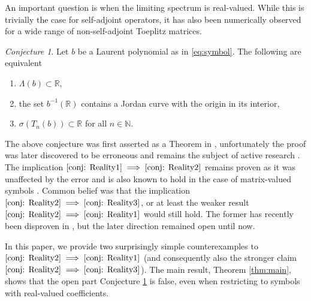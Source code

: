 \documentclass[11pt,a4paper]{amsart}
\theoremstyle{remark}
\numberwithin{equation}{section}
\newtheorem{conjecture}[theorem]{Conjecture}
\newcommand{\R}{\mathbb R}
\newcommand{\N}{\mathbb N}
\begin{document}
An important question is when the limiting spectrum is real-valued. While this is trivially the case for self-adjoint operators, it has also been numerically observed for a wide range of non-self-adjoint Toeplitz matrices.

\begin{conjecture}\label{conj: Reality}
    Let $b$ be a Laurent polynomial as in \eqref{eq:symbol}. The following are equivalent
    \begin{enumerate}
        \item\label{conj: Reality1} $\Lambda(b)\subset\R$,
        \item\label{conj: Reality2} the set $b^{-1}(\R)$ contains a Jordan curve with the origin in its interior,
        \item\label{conj: Reality3} $\sigma(T_n(b))\subset \R$ for all $n\in\N$.
    \end{enumerate}
\end{conjecture}

The above conjecture was first asserted as a Theorem in \cite{shapiro2019non}, unfortunately the proof was later discovered to be erroneous \cite{Shapiro2023} and remains the subject of active research \cite{de2026mathematical,townsend2026openproblemsnla}. The implication $\eqref{conj: Reality1}\implies\eqref{conj: Reality2}$ remains proven as it was unaffected by the error and is also known to hold in the case of matrix-valued symbols \cite{giandinoto2024reality}. Common belief was that the implication $\eqref{conj: Reality2}\implies\eqref{conj: Reality3}$, or at least the weaker result $\eqref{conj: Reality2}\implies\eqref{conj: Reality1}$ would still hold. The former has recently been disproven in \cite{colbrook2026sp06}, but the later direction remained open until now.

In this paper, we provide two surprisingly simple counterexamples to $\eqref{conj: Reality2}\implies\eqref{conj: Reality1}$ (and consequently also the stronger claim $\eqref{conj: Reality2}\implies\eqref{conj: Reality3}$). The main result, Theorem \ref{thm:main}, shows that the open part Conjecture \ref{conj: Reality} is false, even when restricting to symbols with real-valued coefficients.
\end{document}
